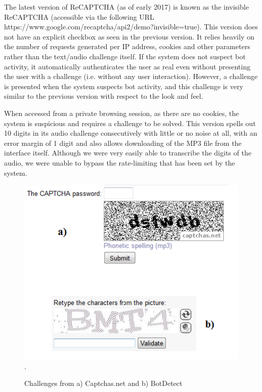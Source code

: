 The latest version of ReCAPTCHA (as of early 2017) is known as the invisible ReCAPTCHA (accessible via the following URL https://www.google.com/recaptcha/api2/\newline demo?invisible=true). This version does not have an explicit checkbox as seen in the previous version. It relies heavily on the number of requests generated per IP address, cookies and other parameters rather than the text/audio challenge itself. If the system does not suspect bot activity, it automatically authenticates the user as real even without presenting the user with a challenge (i.e. without any user interaction). However, a challenge is presented when the system suspects bot activity, and this challenge is very similar to the previous version with respect to the look and feel. \newline

When accessed from a private browsing session, as there are no cookies, the system is suspicious and requires a challenge to be solved. This version spells out 10 digits in its audio challenge consecutively with little or no noise at all, with an error margin of 1 digit and also allows downloading of the MP3 file from the interface itself. Although we were very easily able to transcribe the digits of the audio, we were unable to bypass the rate-limiting that has been set by the system.\newline

\begin{figure}[t]
   \centering
   \includegraphics[width=\columnwidth]{figures/botcaptcha_net.png}.
   \caption{Challenges from a) Captchas.net and b) BotDetect}
   \label{fig:speechrecognizers}
\end{figure}


